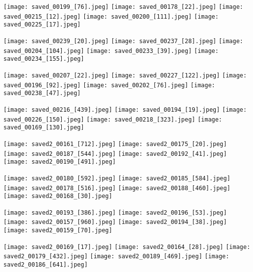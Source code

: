 \documentclass[10pt,onecolumn,letterpaper]{article}
\begin{document}
 \texttt{[image: saved\_00199\_[76].jpeg]}
 \texttt{[image: saved\_00178\_[22].jpeg]}
 \texttt{[image: saved\_00215\_[12].jpeg]}
 \texttt{[image: saved\_00200\_[111].jpeg]}
\texttt{[image: saved\_00225\_[17].jpeg]}

\texttt{[image: saved\_00239\_[20].jpeg]}
\texttt{[image: saved\_00237\_[28].jpeg]}
\texttt{[image: saved\_00204\_[104].jpeg]}
\texttt{[image: saved\_00233\_[39].jpeg]}
\texttt{[image: saved\_00234\_[155].jpeg]}

\texttt{[image: saved\_00207\_[22].jpeg]}
\texttt{[image: saved\_00227\_[122].jpeg]}
\texttt{[image: saved\_00196\_[92].jpeg]}
\texttt{[image: saved\_00202\_[76].jpeg]}
\texttt{[image: saved\_00238\_[47].jpeg]}

\texttt{[image: saved\_00216\_[439].jpeg]}
\texttt{[image: saved\_00194\_[19].jpeg]}
\texttt{[image: saved\_00226\_[150].jpeg]}
\texttt{[image: saved\_00218\_[323].jpeg]}
\texttt{[image: saved\_00169\_[130].jpeg]}

\texttt{[image: saved2\_00161\_[712].jpeg]}
\texttt{[image: saved2\_00175\_[20].jpeg]}
\texttt{[image: saved2\_00187\_[544].jpeg]}
\texttt{[image: saved2\_00192\_[41].jpeg]}
\texttt{[image: saved2\_00190\_[491].jpeg]}

\texttt{[image: saved2\_00180\_[592].jpeg]}
\texttt{[image: saved2\_00185\_[584].jpeg]}
\texttt{[image: saved2\_00178\_[516].jpeg]}
\texttt{[image: saved2\_00188\_[460].jpeg]}
\texttt{[image: saved2\_00168\_[30].jpeg]}

\texttt{[image: saved2\_00193\_[386].jpeg]}
\texttt{[image: saved2\_00196\_[53].jpeg]}
\texttt{[image: saved2\_00157\_[960].jpeg]}
\texttt{[image: saved2\_00194\_[38].jpeg]}
\texttt{[image: saved2\_00159\_[70].jpeg]}

\texttt{[image: saved2\_00169\_[17].jpeg]}
\texttt{[image: saved2\_00164\_[28].jpeg]}
\texttt{[image: saved2\_00179\_[432].jpeg]}
\texttt{[image: saved2\_00189\_[469].jpeg]}
\texttt{[image: saved2\_00186\_[641].jpeg]}
\end{document}
